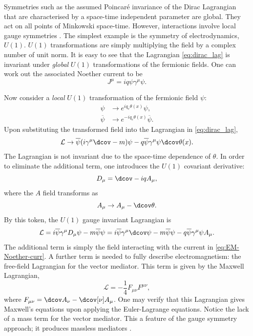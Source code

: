 Symmetries such as the assumed Poincaré invariance of the Dirac Lagrangian that are characterised by a space-time independent parameter are global. They act on all points of Minkowski space-time. However, interactions involve local gauge symmetries \cite{goldberg_standard_2017}. The simplest example is the symmetry of electrodynamics, $U(1)$. $U(1)$ transformations are simply multiplying the field by a complex number of unit norm. It is easy to see that the Lagrangian \eqref{eq:dirac_lag} is invariant under \textit{global} $U(1)$ transformations of the fermionic fields. One can work out the associated Noether current to be
\begin{equation}\label{eq:EM-Noether-curr}
    J^\mu = iq\psi \gamma^\mu \psi.
\end{equation}

Now consider a \textit{local} $U(1)$ transformation of the fermionic field $\psi$:
\begin{align*}
    \psi &\longrightarrow e^{iq_e\theta(x)}\psi,\\
    \overline{\psi} &\longrightarrow e^{-iq_e\theta(x)}\overline{\psi}.
\end{align*}
Upon substituting the transformed field into the Lagrangian in \eqref{eq:dirac_lag}, 
\begin{equation}
    \mathcal{L}\rightarrow  \overline{\psi}(i\gamma^\mu \dcov-m)\psi-q\overline{\psi}\gamma^\mu\psi\dcov \theta(x).
\end{equation}
The Lagrangian is not invariant due to the space-time dependence of $\theta$. In order to eliminate the additional term, one introduces the $U(1)$ covariant derivative:
\begin{equation}
    D_\mu = \dcov - iq A_\mu,
\end{equation}
where the $A$ field transforms as
\begin{equation}
    A_\mu \rightarrow A_\mu - \dcov \theta.
\end{equation}
By this token, the $U(1)$ gauge invariant Lagrangian is
\begin{equation}
    \mathcal{L}=i\overline{\psi}\gamma^\mu D_\mu \psi - m\overline{\psi}\psi = i\overline{\psi}\gamma^\mu\dcov \psi - m\overline{\psi}\psi-q\overline{\psi}\gamma^\mu\psi A_\mu.
\end{equation}
The additional term is simply the field interacting with the current in \eqref{eq:EM-Noether-curr}. A further term is needed to fully describe electromagnetism: the free-field Lagrangian for the vector mediator. This term is given by the Maxwell Lagrangian,
\begin{equation}\label{eq:EM-free-field}
    \mathcal{L}=-\frac{1}{4}F_{\mu\nu}F^{\mu\nu},
\end{equation}
where $F_{\mu\nu}=\dcov A_\nu-\dcov[\nu] A_\mu$. One may verify that this Lagrangian gives Maxwell's equations upon applying the Euler-Lagrange equations. Notice the lack of a mass term for the vector mediator. This a feature of the gauge symmetry approach; it produces massless mediators \cite{goldberg_standard_2017}.


